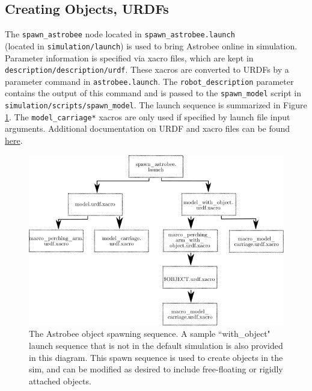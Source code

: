 \documentclass{article}
\begin{document}
\subsection{Creating Objects, URDFs}

The \texttt{spawn\_astrobee} node located in \texttt{spawn\_astrobee.launch} \\
(located in \texttt{simulation/launch}) is used to bring Astrobee online in simulation. Parameter information is specified via xacro files, which are kept in \texttt{description/description/urdf}. These xacros are converted to URDFs by a parameter command in \texttt{astrobee.launch}. The \texttt{robot\_description} parameter contains the output of this command and is passed to the \texttt{spawn\_model} script in \texttt{simulation/scripts/spawn\_model}. The launch sequence is summarized in Figure \ref{fig:spawn}. The \texttt{model\_carriage*} xacros are only used if specified by launch file input arguments. Additional documentation on URDF and xacro files can be found \href{http://wiki.ros.org/urdf/XML}{here}.

\begin{figure}[h!]
    \begin{adjustwidth}{-0.5in}{-1in}
    \centering
    \includegraphics[width=1.3\textwidth]{img/urdf_diag.png}
    \caption{The Astrobee object spawning sequence. A sample ``with\_object" launch sequence that is not in the default simulation is also provided in this diagram. This spawn sequence is used to create objects in the sim, and can be modified as desired to include free-floating or rigidly attached objects.}
    \label{fig:spawn}
    \end{adjustwidth}
\end{figure}
\end{document}

